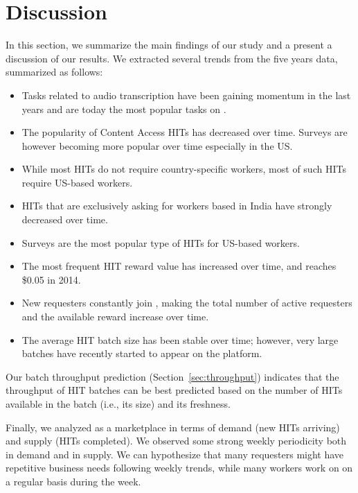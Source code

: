 \section{Discussion}
\label{sec:discuss}

In this section, we summarize the main findings of our study and a present a discussion of our results. We  extracted several trends from the five years data, summarized as follows:
\begin{itemize}[noitemsep,topsep=0pt,parsep=0pt,partopsep=0pt]
	\item Tasks related to audio transcription have been gaining momentum in the last years and are today the most popular tasks on \amt{}.
	\item The popularity of Content Access HITs has decreased over time. Surveys are however becoming more popular over time especially in the US.
	\item While most HITs do not require country-specific workers, most of such HITs require US-based workers.
	\item HITs that are exclusively asking for workers based in India have strongly decreased over time.
	\item Surveys are the most popular type of HITs for US-based workers.
	\item The most frequent HIT reward value has increased over time, and reaches \$0.05 in 2014.
	\item New requesters constantly join \amt{}, making the total number of active requesters and the available reward increase over time.
	\item The average HIT batch size has been stable over time; however, very large batches have recently started to appear on the platform.
\end{itemize}

Our batch throughput prediction (Section~\ref{sec:throughput}) indicates that the throughput of HIT batches can be best predicted based on the number of HITs available in the batch (i.e., its size) and its freshness.

Finally, we analyzed \amt{} as a marketplace in terms of demand (new HITs arriving) and supply (HITs completed). 
We observed some strong weekly periodicity both in demand and in supply. We can hypothesize that many requesters might have repetitive business needs following weekly trends, while many workers work on \amt{} on a regular basis during the week.